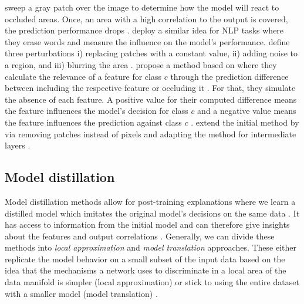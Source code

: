 \citet{ZeilerF14} sweep a gray patch over the image to determine how the model will react to occluded areas. Once, an area with a high correlation to the output is covered, the prediction performance drops \citep{xie2020explainable, ZeilerF14}. \citet{li2016understanding} deploy a similar idea for NLP tasks where they erase words and measure the influence on the model's performance. \citet{FongV17} define three perturbations i) replacing patches with a constant value, ii) adding noise to a region, and  iii) blurring the area \citep{FongV17, xie2020explainable}. \citet{ZintgrafCAW17} propose a method based on \citet{Robnik-SikonjaK08} where they calculate the relevance of a feature for class $c$ through the prediction difference between including the respective feature or occluding it \citep{ZintgrafCAW17}. For that, they simulate the absence of each feature. A positive value for their computed difference means the feature influences the model's decision for class $c$ and a negative value means the feature influences the prediction against class $c$ \citep{ZintgrafCAW17}. \citet{ZintgrafCAW17} extend the initial method by \citet{Robnik-SikonjaK08} via removing patches instead of pixels and adapting the method for intermediate layers \citep{xie2020explainable}.

\subsection{Model distillation}
Model distillation methods allow for post-training explanations where we learn a distilled model which imitates the original model's decisions on the same data \citep{xie2020explainable}. It has access to information from the initial model and can therefore give insights about the features and output correlations \citep{xie2020explainable}. Generally, we can divide these methods into \emph{local approximation} and \emph{model translation} approaches. These either replicate the model behavior on a small subset of the input data based on the idea that the mechanisms a network uses to discriminate in a local area of the data manifold is simpler (local approximation) or stick to using the entire dataset with a smaller model (model translation) \citep{xie2020explainable}. 

